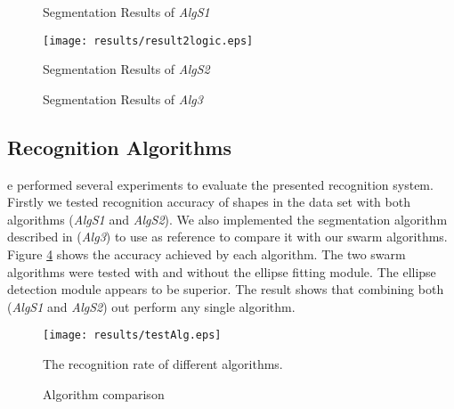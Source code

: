 \begin{figure}

	\centering
	\caption{Segmentation Results of \textsl{AlgS1}}
	\label{fig:results1}

\end{figure}

\begin{figure}
	\centering
			\texttt{[image: results/result2logic.eps]}
	\caption{Segmentation Results of \textsl{AlgS2}}
	\label{fig:results2}
\end{figure}
\begin{figure}
	\centering
		
	\caption{Segmentation Results of \textsl{Alg3} }
	\label{fig:results3}
\end{figure}



\subsection {Recognition Algorithms}
\label{sec:RecognitionAlgorithms}


e performed several experiments to evaluate the presented recognition system. Firstly we tested recognition accuracy of shapes in the data set with both algorithms (\textsl{AlgS1} and \textsl{AlgS2}). We also implemented the segmentation algorithm described in \cite{earlyprocess} (\textsl{Alg3}) to use as reference to compare it with our swarm algorithms. Figure \ref{fig:test1} shows the accuracy achieved by each algorithm. The two swarm algorithms were tested with and without the ellipse fitting module. The ellipse detection module appears to be superior. The result shows that combining both  (\textsl{AlgS1} and \textsl{AlgS2}) out perform any single algorithm. %

 \begin{figure}
	\centering		
	 \texttt{[image: results/testAlg.eps]}
	 	\caption{Algorithm comparison} The recognition rate of different algorithms. 
	 	\label{fig:test1}
\end{figure} 


